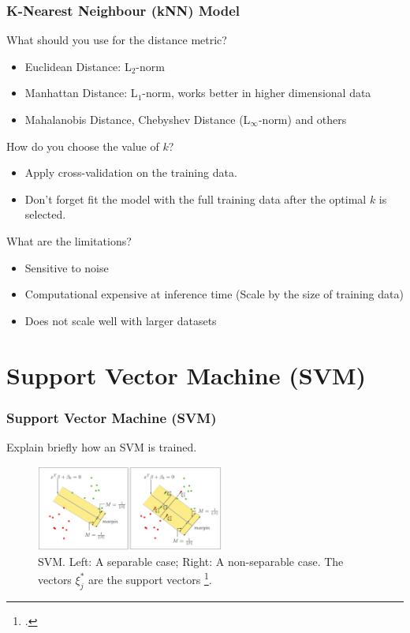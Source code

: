 \documentclass[aspectratio=169, 10pt]{beamer}
\begin{document}
\begin{frame}[t]
    \frametitle{K-Nearest Neighbour (kNN) Model}

    What should you use for the distance metric?
    \pause
    \begin{itemize}
        \item Euclidean Distance: L$_2$-norm
        \item Manhattan Distance: L$_1$-norm, works better in higher dimensional data
        \item Mahalanobis Distance, Chebyshev Distance (L$_\infty$-norm) and others
    \end{itemize}

    \vspace{1em}
    How do you choose the value of $k$?
    \pause
    \begin{itemize}
        \item Apply cross-validation on the training data. 
        \item Don't forget fit the model with the full training data after the optimal $k$ is selected.
    \end{itemize}

    \vspace{1em}
    What are the limitations?
    \pause
    \begin{itemize}
        \item Sensitive to noise
        \item Computational expensive at inference time (Scale by the size of training data)
        \item Does not scale well with larger datasets
    \end{itemize}

\end{frame}

\section{Support Vector Machine (SVM)}
\begin{frame}[t]
    \frametitle{Support Vector Machine (SVM)}
    Explain briefly how an SVM is trained.
    \pause

    \begin{figure}
        \small
        \centering
        \includegraphics[width=0.55\textwidth]{../imgs/svm_hastie_2009.png}
        \caption{SVM. Left: A separable case; Right: A non-separable case. The 
        vectors $\xi_j^*$ are the support vectors \footcite{hastie2009elements}.}
    \end{figure}
\end{frame}
\end{document}
